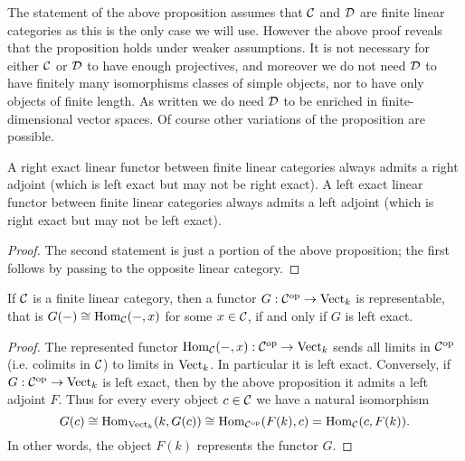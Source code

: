 \documentclass{amsart}
\begin{document}
\begin{remark}
	The statement of the above proposition assumes that $\mathcal C$ and $\mathcal D$ are finite linear categories as this is the only case we will use. However the above proof reveals that the proposition holds under weaker assumptions. It is not necessary for either $\mathcal C$ or $\mathcal D$ to have enough projectives, and moreover we do not need $\mathcal D$ to have finitely many isomorphisms classes of simple objects, nor to have only objects of finite length. As written we do need $\mathcal D$ to be enriched in finite-dimensional vector spaces. Of course other variations of the proposition are possible. 
\end{remark}

\begin{corollary}
	A right exact linear functor between finite linear categories always admits a right adjoint (which is left exact but may not be right exact). A left exact linear functor between finite linear categories always admits a left adjoint (which is right exact but may not be left exact). 
\end{corollary}

\begin{proof}
	The second statement is just a portion of the above proposition; the first follows by passing to the opposite linear category.  
\end{proof}

\begin{corollary} \label{cor:representable}
If $\mathcal C$ is a finite linear category, then a functor $G: \mathcal C^\textrm{op} \to \mathrm{Vect}_k$ is representable, that is $G(-) \cong \operatorname{Hom}_{\mathcal C}(-,x)$ for some $x \in \mathcal C$, if and only if $G$ is left exact. 
\end{corollary}

\begin{proof}
	The represented functor $\operatorname{Hom}_{\mathcal C}(-, x):\mathcal C^\text{op} \to \mathrm{Vect}_k$ sends all limits in $\mathcal C^\text{op}$ (i.e. colimits in $\mathcal C$) to limits in $\mathrm{Vect}_k$. In particular it is left exact. 
%
%		
Conversely, if $G: \mathcal C^\text{op} \to \mathrm{Vect}_k$ is left exact, then by the above proposition it admits a left adjoint $F$. Thus for every every object $c \in \mathcal C$ we have a natural isomorphism
	\begin{equation*}
		G(c) \cong \operatorname{Hom}_{\mathrm{Vect}_k}( k, G(c)) \cong \operatorname{Hom}_{\mathcal C^{\mathrm{op}}}( F(k), c) = \operatorname{Hom}_{\mathcal C}(c, F(k) ).
	\end{equation*}
	In other words,  the object $F(k)$ represents the functor $G$. 
\end{proof}
\end{document}

